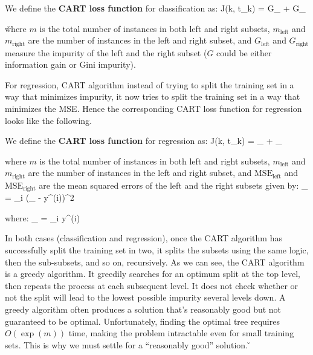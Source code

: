 We define the \textbf{CART loss function} for classification as:
\bse
J(k, t_{k}) =  G_{} +  G_{}
\ese

\v

where $m$ is the total number of instances in both left and right subsets, $m_{\text{left}}$ and
$m_{\text{right}}$ are the number of instances in the left and right subset, and $G_{\text{left}}$ and
$G_{\text{right}}$ measure the impurity of the left and the right subset ($G$ could be either information gain or
Gini impurity).
\ed

For regression, CART algorithm instead of trying to split the training set in a way that minimizes impurity, it now
tries to split the training set in a way that minimizes the MSE. Hence the corresponding CART loss function for
regression looks like the following.

We define the \textbf{CART loss function} for regression as:
\bse
J(k, t_{k}) =  _{}
+ _{}
\ese

where $m$ is the total number of instances in both left and right subsets, $m_{\text{left}}$ and
$m_{\text{right}}$ are the number of instances in the left and right subset, and $\text{MSE}_{\text{left}}$ and
$\text{MSE}_{\text{right}}$ are the mean squared errors of the left and the right subsets given by:
\bse
{}_{} = \sum_{i \in {}} ({}_ - y^{(i)})^2
\ese

where:
\bse
{}_ =  \sum_{i \in {}} y^{(i)}
\ese
\ed

In both cases (classification and regression), once the CART algorithm has successfully split the training set in
two, it splits the subsets using the same logic, then the sub-subsets, and so on, recursively. As we can see, the
CART algorithm is a greedy algorithm. It greedily searches for an optimum split at the top level, then repeats the
process at each subsequent level. It does not check whether or not the split will lead to the lowest possible
impurity several levels down. A greedy algorithm often produces a solution that's reasonably good but not guaranteed
to be optimal. Unfortunately, finding the optimal tree requires $O(\exp(m)) $ time, making the problem intractable
even for small training sets. This is why we must settle for a ``reasonably good'' solution. \v

